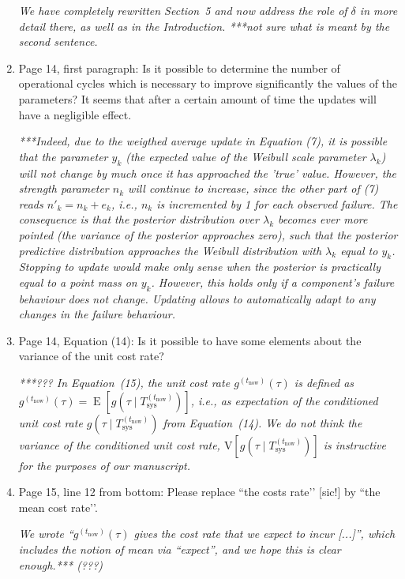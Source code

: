 \documentclass[authoryear]{elsarticle}
\newcommand{\E}{\operatorname{E}}
\def\tnow{t_\text{now}}
\newcommand{\Tsysnow}{T^{(t_\text{now})}_\text{sys}}
\newcommand{\gnow}{g^{(\tnow)}}
\begin{document}
\begin{enumerate}
\smallskip

\emph{We have completely rewritten Section~5 and now address the role of $\delta$ in more detail there, as well as in the Introduction.
***not sure what is meant by the second sentence.}

\item Page 14, first paragraph: Is it possible to determine the number of operational cycles which is necessary to improve significantly the values of the parameters? It seems that after a certain amount of time the updates will have a negligible effect. 

\smallskip

\emph{***Indeed, due to the weigthed average update in Equation (7),
it is possible that the parameter $y_k$ (the expected value of the Weibull scale parameter $\lambda_k$)
will not change by much once it has approached the 'true' value.
However, the strength parameter $n_k$ will continue to increase,
since the other part of (7) reads $n'_k = n_k + e_k$, i.e.,
$n_k$ is incremented by 1 for each observed failure.
The consequence is that the posterior distribution over $\lambda_k$ becomes ever more pointed
(the variance of the posterior approaches zero),
such that the posterior predictive distribution approaches the Weibull distribution with $\lambda_k$ equal to $y_k$.
Stopping to update would make only sense when the posterior is practically equal to a point mass on $y_k$.
However, this holds only if a component's failure behaviour does not change.
Updating allows to automatically adapt to any changes in the failure behaviour.}

\item Page 14, Equation (14): Is it possible to have some elements about the variance of the unit cost rate?

\smallskip

\emph{***??? In Equation~(15), the unit cost rate $\gnow(\tau)$ is defined as
$\gnow(\tau) = \E[g(\tau \mid \Tsysnow)]$,
i.e., as expectation of the conditioned unit cost rate $g(\tau \mid \Tsysnow)$ from Equation~(14).
We do not think the variance of the conditioned unit cost rate,
$\text{V}[g(\tau \mid \Tsysnow)]$ is instructive for the purposes of our manuscript.}

\item Page 15, line 12 from bottom: Please replace ``the costs rate’’ [sic!] by ``the mean cost rate’’.

\smallskip

\emph{We wrote ``$\gnow(\tau)$ gives the cost rate that we expect to incur [...]'',
which includes the notion of mean via ``expect'', and we hope this is clear enough.*** (???)}
\end{enumerate}
\end{document}
